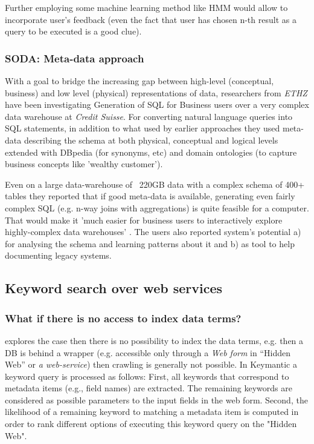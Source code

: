 Further employing some machine learning method like HMM\cite{kw_cleaning_hmm} would allow to incorporate user's feedback (even the fact that user has chosen n-th result as a query to be executed is a good clue).


\subsubsection*{SODA: Meta-data approach}

With a goal to bridge the increasing gap between high-level (conceptual, business) and low level (physical) representations of data, researchers from \textit{ETHZ} have been investigating Generation of SQL for Business users over a very complex data warehouse at \textit{Credit Suisse}.  For converting natural language queries 
 into SQL statements, in addition to what used by earlier approaches they used meta-data describing the schema at both physical, conceptual and logical levels extended with DBpedia (for synonyms, etc) and domain ontologies (to capture business concepts like 'wealthy customer').

Even on a large data-warehouse of ~220GB data with a complex schema of 400+ tables they reported that if good meta-data is available, generating even fairly complex SQL  (e.g. n-way joins with aggregations) is quite feasible for a computer. That would make it 'much easier for business users to interactively explore highly-complex data warehouses' \cite[p.932]{ethz2012}. The users also reported system's potential a) for analysing the schema and learning patterns about it and b) as tool to help documenting legacy systems.


\subsection{Keyword search over web services}


\subsubsection*{What if there is no access to index data terms?}
\cite{Keymantic10, semantics_without_access} explores the case then there is no possibility to index the data terms, e.g. then a DB is behind a wrapper (e.g. accessible only through a \textit{Web form} in “Hidden Web” or \textit{a web-service}) then crawling is generally not possible.
%
In Keymantic\cite{Keymantic10} a keyword query is processed as follows: First, all keywords that  correspond to metadata items (e.g., field names) are extracted. The remaining keywords are considered as possible parameters to the input fields in the web form. Second, the likelihood of a remaining keyword to matching a metadata item is computed in order to rank different options of executing this keyword query on the "Hidden Web"\cite[p.942]{ethz2012}.


